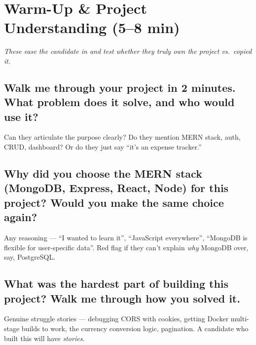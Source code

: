 \documentclass[12pt, a4paper]{article}
\begin{document}
\vspace{1cm}

\section{Warm-Up \& Project Understanding \textnormal{\textcolor{slatelight}{(5--8 min)}}}

\emph{These ease the candidate in and test whether they truly own the project vs.\ copied it.}

\subsection{Walk me through your project in 2 minutes. What problem does it solve, and who would use it?}

\begin{listenfor}
Can they articulate the purpose clearly? Do they mention MERN stack, auth, CRUD, dashboard? Or do they just say ``it's an expense tracker.''
\end{listenfor}

\subsection{Why did you choose the MERN stack (MongoDB, Express, React, Node) for this project? Would you make the same choice again?}

\begin{listenfor}
Any reasoning — ``I wanted to learn it'', ``JavaScript everywhere'', ``MongoDB is flexible for user-specific data''. Red flag if they can't explain \emph{why} MongoDB over, say, PostgreSQL.
\end{listenfor}

\subsection{What was the hardest part of building this project? Walk me through how you solved it.}

\begin{listenfor}
Genuine struggle stories — debugging CORS with cookies, getting Docker multi-stage builds to work, the currency conversion logic, pagination. A candidate who built this will have \emph{stories}.
\end{listenfor}
\end{document}
